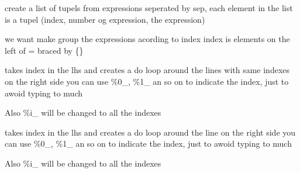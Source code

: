 \documentclass[letterpaper,10pt,english]{sphinxmanual}
\begin{document}

\begin{fulllineitems}
\label{\detokenize{index:modelmanipulation.doablelist}}
\pysigstartsignatures
{}
\pysigstopsignatures
\sphinxAtStartPar
create a list of tupels from expressions seperated by sep,
each element in the list is a tupel (index, number og expression, the expression)

\sphinxAtStartPar
we want make group the expressions acording to index
index is elements on the left of = braced by \{\}

\end{fulllineitems}


\begin{fulllineitems}
\label{\detokenize{index:modelmanipulation.doablekeep}}
\pysigstartsignatures
{}
\pysigstopsignatures
\sphinxAtStartPar
takes index in the lhs and creates a do loop around the lines with same indexes
on the right side you can use \%0\_, \%1\_ an so on to indicate the index, just to awoid typing to much

\sphinxAtStartPar
Also \%i\_ will be changed to all the indexes

\end{fulllineitems}


\begin{fulllineitems}
\label{\detokenize{index:modelmanipulation.doable}}
\pysigstartsignatures
{}
\pysigstopsignatures
\sphinxAtStartPar
takes index in the lhs and creates a do loop around the line
on the right side you can use \%0\_, \%1\_ an so on to indicate the index, just to awoid typing to much

\sphinxAtStartPar
Also \%i\_ will be changed to all the indexes

\end{fulllineitems}
\end{document}

